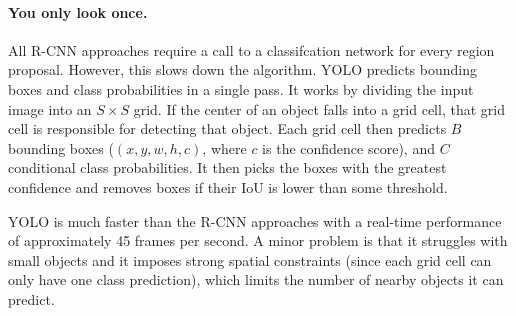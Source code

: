 \paragraph{You only look once.}

All R-CNN approaches require a call to a classifcation network for every region
proposal. However, this slows down the algorithm. YOLO \citep{redmon2016you}
predicts bounding boxes and class probabilities in a single pass.
It works by dividing the input image into an $S\times S$ grid. If the center of
an object falls into a grid cell, that grid cell is responsible for detecting
that object. Each grid cell then predicts $B$ bounding boxes ($(x,y,w,h,c)$,
where $c$ is the confidence score), and $C$ conditional class
probabilities. It then picks the boxes with the greatest
confidence and removes boxes if their IoU is lower than some threshold.

YOLO is much faster than the R-CNN approaches with a real-time performance of
approximately 45 frames per second. A minor problem is that it struggles with
small objects and it imposes strong spatial constraints (since each grid cell
can only have one class prediction), which limits the number of nearby objects
it can predict.
